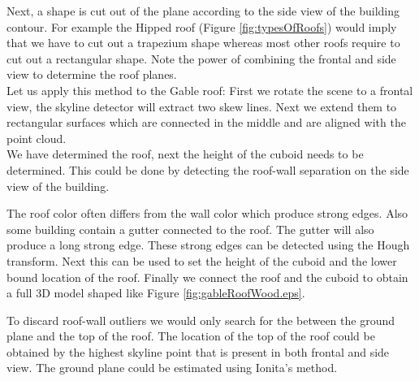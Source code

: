 Next, a shape is cut out of the plane according to the side view of the building contour.
For example the Hipped roof (Figure \ref{fig:typesOfRoofs}) would imply that we have to cut
out a trapezium shape whereas most other roofs require to cut out a rectangular shape.
Note the power of combining the frontal and side view to determine the roof
planes.\\

Let us apply this method to the Gable roof: First we rotate the scene to a
frontal view, the skyline detector will extract two skew lines. Next we extend them to 
rectangular surfaces which are connected in the middle and are aligned with the
point cloud.\\

We have determined the roof, next the height of the cuboid needs to be determined.
This could be done by detecting the roof-wall separation on the side view of the
building.  

The roof color often differs from the wall color which produce strong edges. 
Also some building contain a gutter connected to the roof. The gutter will also
produce a long strong edge.  
These strong edges can be detected using the Hough transform. Next this can be
used to set the height of the cuboid and the lower bound location of the roof.
Finally we connect the roof and the cuboid to obtain a full 3D model shaped like
Figure \ref{fig:gableRoofWood.eps}.

To discard roof-wall outliers we would only search for the between the ground plane and the top of
the roof.  The location of the top of the roof could be obtained by the highest skyline point that
is present in both frontal and side view. The ground plane could be estimated
using Ionita's \cite{costin} method.
\clearpage


